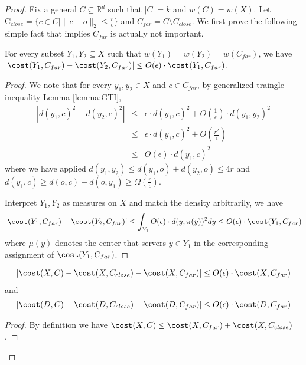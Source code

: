 \begin{proof}
Fix a general $C\subseteq \mathbb{R}^d$ such that $|C|=k$ and $w(C)=w(X)$.
Let $\mathrm{C}_{close}=\{c\in C|\|c-o\|_2\leq \frac{r}{\epsilon}\}$ and $C_{far}=C\setminus C_{close}$. We first prove the following simple fact that implies $C_{far}$ is actually not important.

\begin{claim} \label{claim:ringfar}
For every subset $Y_1,Y_2\subseteq X$ such that $w(Y_1)=w(Y_2)=w(C_{far})$, we have 
$|\cost(Y_1,C_{far})-\cost(Y_2,C_{far})|\leq O(\epsilon)\cdot \cost(Y_1,C_{far})$.
\end{claim}

\begin{proof}
We note that for every $y_1,y_2\in X$ and $c\in C_{far}$, by generalized traingle inequality Lemma \ref{lemma:GTI},  \begin{eqnarray*}|d(y_1,c)^2-d(y_2,c)^2|
&\leq& 
\epsilon \cdot d(y_1,c)^2+O(\frac{1}{\epsilon})\cdot d(y_1,y_2)^2\\
&\leq& \epsilon \cdot d(y_1,c)^2+O(\frac{ r^2}{\epsilon})\\
&\leq & O(\epsilon) \cdot d(y_1,c)^2
\end{eqnarray*}
where we have applied $d(y_1,y_2)\leq d(y_1,o)+d(y_2,o)\leq 4r$ and $d(y_1,c)\geq d(o,c)-d(o,y_1)\geq \Omega(\frac{r}{\epsilon})$.

Interpret $Y_1,Y_2$ as measures on $X$ and match the density arbitrarily, we have
$$
|\cost(Y_1,C_{far})-\cost(Y_2,C_{far})|\leq \int_{Y_1} O(\epsilon)\cdot d(y,\pi(y))^2 dy\leq O(\epsilon)\cdot \cost(Y_1,C_{far})
$$
where $\mu(y)$ denotes the center that servers $y\in Y_1$ in the corresponding assignment of $\cost(Y_1,C_{far})$.
\end{proof}

\begin{claim} \label{claim:ring_close_far}
\begin{eqnarray} \label{eqn:ring_close_far_1}
|\cost(X,C)-\cost(X,C_{close})-\cost(X,C_{far})|\leq O(\epsilon)\cdot \cost(X,C_{far})
\end{eqnarray} and 
\begin{eqnarray} \label{eqn:ring_close_far_2}
|\cost(D,C)-\cost(D,C_{close})-\cost(D,C_{far})|\leq O(\epsilon)\cdot \cost(D,C_{far})
\end{eqnarray}
\end{claim}

\begin{proof}
By definition we have $\cost(X,C)\leq \cost(X,C_{far})+\cost(X,C_{close})$. 


\end{proof}
\end{proof}
